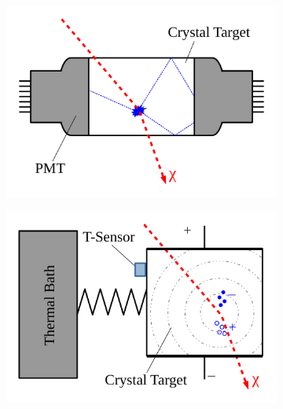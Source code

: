 \begin{figure}[!ht]
     \centering
     \begin{subfigure}{0.49\textwidth}
         \centering
         \includegraphics[width=\textwidth]{figures/DMOverview/crystal.pdf}
         \caption{}
         \label{fig:DMOverview/crystal}
     \end{subfigure}
     \hfill
     \begin{subfigure}{0.49\textwidth}
         \centering
         \includegraphics[width=\textwidth]{figures/DMOverview/cryogenic.pdf}
         \caption{}
         \label{fig:DMOverview/cryogenic}
     \end{subfigure}
     \hfill
     \begin{subfigure}{0.49\textwidth}
         \centering

\end{subfigure}
\end{figure}
